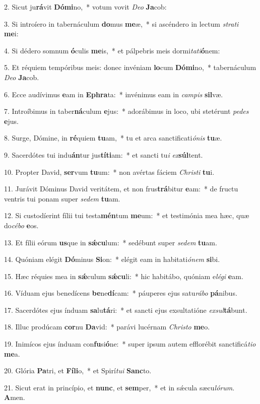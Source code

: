 2. Sicut ju\textbf{rá}vit \textbf{Dó}\textbf{mi}no,~*  votum vovit \textit{De}\textit{o} \textbf{Ja}cob:\

3. Si introíero in tabernáculum \textbf{do}mus \textbf{me}æ,~*  si ascéndero in lectum \textit{stra}\textit{ti} \textbf{me}i:\

4. Si dédero somnum \textbf{ó}culis \textbf{me}is,~*  et pálpebris meis dormi\textit{ta}\textit{ti}\textbf{ó}nem:\

5. Et réquiem tempóribus meis: donec invéniam \textbf{lo}cum \textbf{Dó}\textbf{mi}no,~*  tabernáculum \textit{De}\textit{o} \textbf{Ja}cob.\

6. Ecce audívimus \textbf{e}am in \textbf{E}\textbf{phra}ta:~*  invénimus eam in \textit{cam}\textit{pis} \textbf{sil}væ.\

7. Introíbimus in taber\textbf{ná}culum \textbf{e}jus:~*  adorábimus in loco, ubi stetérunt \textit{pe}\textit{des} \textbf{e}jus.\

8. Surge, Dómine, in \textbf{ré}quiem \textbf{tu}am,~*  tu et arca sanctificati\textit{ó}\textit{nis} \textbf{tu}æ.\

9. Sacerdótes tui indu\textbf{án}tur jus\textbf{tí}\textbf{ti}am:~*  et sancti tu\textit{i} \textit{ex}\textbf{súl}tent.\

10. Propter David, \textbf{ser}vum \textbf{tu}um:~*  non avértas fáciem \textit{Chris}\textit{ti} \textbf{tu}i.\

11. Jurávit Dóminus David veritátem, et non frus\textbf{trá}bitur \textbf{e}am:~*  de fructu ventris tui ponam super \textit{se}\textit{dem} \textbf{tu}am.\

12. Si custodíerint fílii tui testa\textbf{mén}tum \textbf{me}um:~*  et testimónia mea hæc, quæ do\textit{cé}\textit{bo} \textbf{e}os.\

13. Et fílii eórum \textbf{us}que in \textbf{sǽ}\textbf{cu}lum:~*  sedébunt super \textit{se}\textit{dem} \textbf{tu}am.\

14. Quóniam elégit \textbf{Dó}minus \textbf{Si}on:~*  elégit eam in habitati\textit{ó}\textit{nem} \textbf{si}bi.\

15. Hæc réquies mea in \textbf{sǽ}culum \textbf{sǽ}\textbf{cu}li:~*  hic habitábo, quóniam e\textit{lé}\textit{gi} \textbf{e}am.\

16. Víduam ejus benedícens \textbf{be}ne\textbf{dí}cam:~*  páuperes ejus satu\textit{rá}\textit{bo} \textbf{pá}nibus.\

17. Sacerdótes ejus índuam \textbf{sa}lu\textbf{tá}ri:~*  et sancti ejus exsultatióne \textit{ex}\textit{sul}\textbf{tá}bunt.\

18. Illuc prodúcam \textbf{cor}nu \textbf{Da}vid:~*  parávi lucérnam \textit{Chris}\textit{to} \textbf{me}o.\

19. Inimícos ejus índuam con\textbf{fu}si\textbf{ó}ne:~*  super ipsum autem efflorébit sanctificá\textit{ti}\textit{o} \textbf{me}a.\

20. Glória \textbf{Pa}tri, et \textbf{Fí}\textbf{li}o,~*  et Spirí\textit{tu}\textit{i} \textbf{Sanc}to.\

21. Sicut erat in princípio, et \textbf{nunc}, et \textbf{sem}per,~*  et in sǽcula sæcu\textit{ló}\textit{rum}. \textbf{A}men.\

